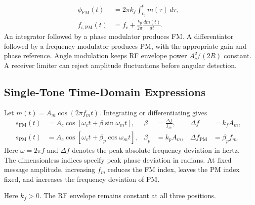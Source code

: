 \documentclass[12pt,a4paper]{article}
\begin{document}
\[
\begin{aligned}
 \phi_{\mathrm{FM}}(t)&=2\pi k_f\int_{t_0}^{t}m(\tau)\,d\tau,\\
 f_{i,\mathrm{PM}}(t)&=f_c+\frac{k_p}{2\pi}\frac{dm(t)}{dt}.
\end{aligned}
\]
An integrator followed by a phase modulator produces FM. A differentiator followed by a frequency modulator produces PM, with the appropriate gain and phase reference. Angle modulation keeps RF envelope power $A_c^2/(2R)$ constant. A receiver limiter can reject amplitude fluctuations before angular detection.

\subsection{Single-Tone Time-Domain Expressions}
Let $m(t)=A_m\cos(2\pi f_mt)$. Integrating or differentiating gives
\[
\begin{aligned}
 s_{\mathrm{FM}}(t)&=A_c\cos[\omega_ct+\beta\sin\omega_mt],
    &\beta&=\frac{\Delta f}{f_m}, & \Delta f&=k_fA_m,\\
 s_{\mathrm{PM}}(t)&=A_c\cos[\omega_ct+\beta_p\cos\omega_mt],
    &\beta_p&=k_pA_m, &\Delta f_{\mathrm{PM}}&=\beta_p f_m.
\end{aligned}
\]
Here $\omega=2\pi f$ and $\Delta f$ denotes the peak absolute frequency deviation in hertz. The dimensionless indices specify peak phase deviation in radians. At fixed message amplitude, increasing $f_m$ reduces the FM index, leaves the PM index fixed, and increases the frequency deviation of PM.

\begin{tcolorbox}[tikzbox, unbreakable, title={FM Becomes Denser Where Instantaneous Frequency Is Higher}]
\centering
{}\par
\small Here $k_f>0$. The RF envelope remains constant at all three positions.
\end{tcolorbox}
\end{document}
